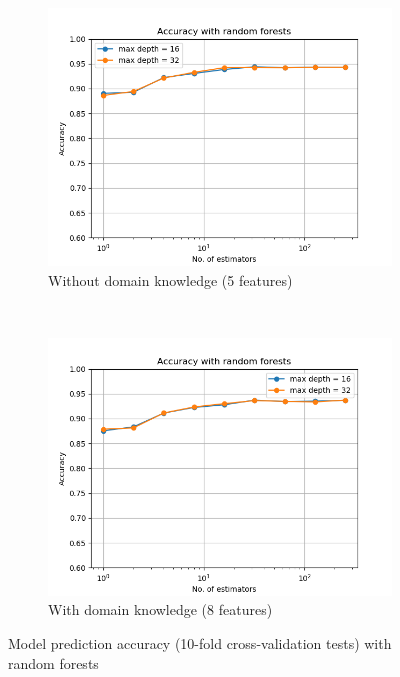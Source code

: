 \documentclass{article}
\begin{document}
\begin{figure}[h!]
    \centering
    \begin{subfigure}[b]{0.45\textwidth}
        \includegraphics[width=\textwidth]{../figures/wo_domain_knowledge/accuracy_rand_forests.png}
        \caption{Without domain knowledge (5  features)}
        \label{fig:rf_wo}
    \end{subfigure}
    ~ %
    \begin{subfigure}[b]{0.45\textwidth}
        \includegraphics[width=\textwidth]{../figures/w_domain_knowledge/accuracy_rand_forests.png}
        \caption{With domain knowledge (8  features)}
        \label{fig:rf_w}
    \end{subfigure}
    \caption{Model prediction accuracy (10-fold cross-validation tests) with random forests}\label{fig:rf}
\end{figure}
\end{document}
